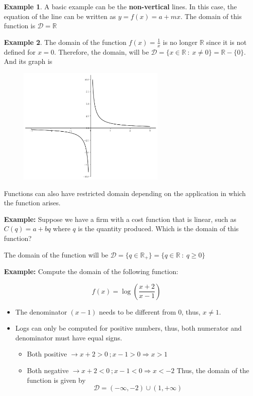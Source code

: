\documentclass[a4paper,11pt]{article}
\theoremstyle{definition}
\newtheorem{example}{Example}
\theoremstyle{plain}
\begin{document}
\begin{example} 
A basic example can be the \textbf{non-vertical} lines.
In this case, the equation of the line can be written as
\(y = f(x) = a + m x\). The domain of this function is
\(\mathcal{D} = \mathbb{R}\)
\end{example}

\begin{example} 
The domain of the function \(f(x) = \frac{1}{x}\) is no
longer \(\mathbb{R}\) since it is not defined for \(x = 0\). Therefore,
the domain, will be
\(\mathcal{D} = \{x\in\mathbb{R} \ : \ x\neq 0\} = \mathbb{R} - \{0\}\).
And its graph is
\end{example}

    \begin{figure}[htbp]
    	\centering 
    		\includegraphics[width = 0.65\textwidth]{Ch1_files/Ch1_14_0.png}
    \end{figure}
    
Functions can also have restricted domain depending on the application
in which the function arises.

\textbf{Example:} Suppose we have a firm with a cost function that is
linear, such as \(C(q) = a + b q\) where \(q\) is the quantity produced.
Which is the domain of this function?

The domain of the function will be
\(\mathcal{D} = \{q\in\mathbb{R}_+\} = \{q\in\mathbb{R} \ : \ q\geq 0 \}\)

\textbf{Example:} Compute the domain of the following function:

\[
f(x) = \log\left(\frac{x+2}{x-1}\right)
\]

\begin{itemize}
	\item
  The denominator \((x-1)\) needs to be different from \(0\), thus,
  \(x\neq 1\).
\item
  Logs can only be computed for positive numbers, thus, both numerator
  and denominator must have equal signs.

  \begin{itemize}
 
   \item
    Both positive \(\rightarrow x+2 > 0 \ ; x-1 > 0 \Rightarrow x > 1\)
  \item
    Both negative \(\rightarrow x+2 < 0 \ ; x-1 < 0 \Rightarrow x < -2\)
    Thus, the domain of the function is given by \[
    \mathcal{D} = (-\infty, -2)\cup(1,+\infty)
    \]
  \end{itemize}
\end{itemize}
\end{document}
